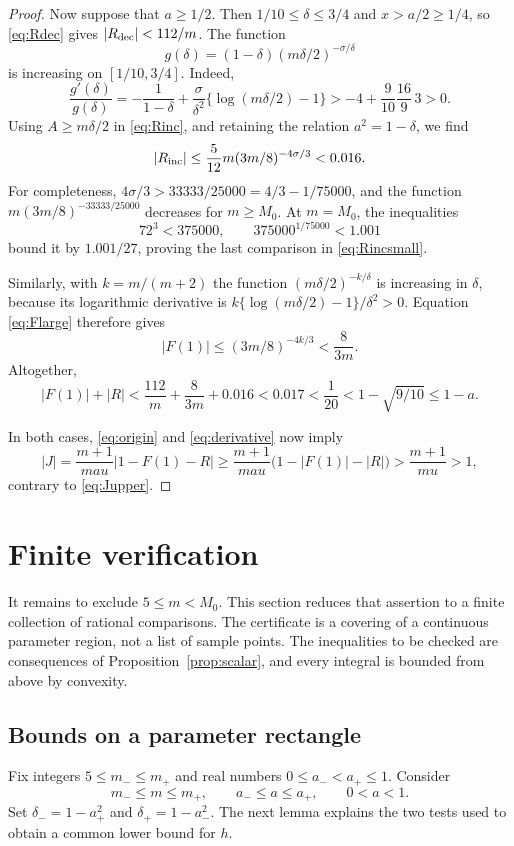 \documentclass[11pt,letterpaper,reqno]{amsart}
\theoremstyle{definition}
\numberwithin{equation}{section}
\begin{document}
\begin{proof}
Now suppose that $a\ge1/2$. Then $1/10\le\delta\le3/4$ and $x>a/2\ge1/4$, so \eqref{eq:Rdec} gives $|R_{\rm dec}|<112/m$. The function
\[
 g(\delta)=(1-\delta)(m\delta/2)^{-\sigma/\delta}
\]
is increasing on $[1/10,3/4]$. Indeed,
\[
 \frac{g'(\delta)}{g(\delta)}
 =-\frac1{1-\delta}
   +\frac{\sigma}{\delta^2}\{\log(m\delta/2)-1\}
 >-4+\frac9{10}\frac{16}{9}\,3>0.
\]
Using $A\ge m\delta/2$ in \eqref{eq:Rinc}, and retaining the relation $a^2=1-\delta$, we find
\begin{equation}\label{eq:Rincsmall}
 |R_{\rm inc}|\le\frac5{12}m(3m/8)^{-4\sigma/3}<0.016.
\end{equation}
For completeness, $4\sigma/3>33333/25000=4/3-1/75000$, and the function
$m(3m/8)^{-33333/25000}$ decreases for $m\ge M_0$. At $m=M_0$, the inequalities
\[
 72^3<375000,\qquad 375000^{1/75000}<1.001
\]
bound it by $1.001/27$, proving the last comparison in \eqref{eq:Rincsmall}.

Similarly, with $k=m/(m+2)$ the function $(m\delta/2)^{-k/\delta}$ is increasing in $\delta$, because its logarithmic derivative is
$k\{\log(m\delta/2)-1\}/\delta^2>0$. Equation \eqref{eq:Flarge} therefore gives
\[
 |F(1)|\le(3m/8)^{-4k/3}<\frac8{3m}.
\]
Altogether,
\[
 |F(1)|+|R|<\frac{112}{m}+\frac8{3m}+0.016
 <0.017<\frac1{20}<1-\sqrt{9/10}\le1-a.
\]

In both cases, \eqref{eq:origin} and \eqref{eq:derivative} now imply
\[
 |J|=\frac{m+1}{ma u}|1-F(1)-R|
 \ge\frac{m+1}{ma u}\bigl(1-|F(1)|-|R|\bigr)
 >\frac{m+1}{m u}>1,
\]
contrary to \eqref{eq:Jupper}.
\end{proof}

\section{Finite verification}\label{sec:finite}

It remains to exclude $5\le m<M_0$. This section reduces that assertion to a finite collection of rational comparisons. The certificate is a covering of a continuous parameter region, not a list of sample points. The inequalities to be checked are consequences of Proposition~\ref{prop:scalar}, and every integral is bounded from above by convexity.

\subsection{Bounds on a parameter rectangle}
Fix integers $5\le m_-\le m_+$ and real numbers $0\le a_-<a_+\le1$. Consider
\begin{equation}\label{eq:box}
 m_-\le m\le m_+,\qquad a_-\le a\le a_+,
 \qquad 0<a<1.
\end{equation}
Set $\delta_-=1-a_+^2$ and $\delta_+=1-a_-^2$. The next lemma explains the two tests used to obtain a common lower bound for $h$.
\end{document}
